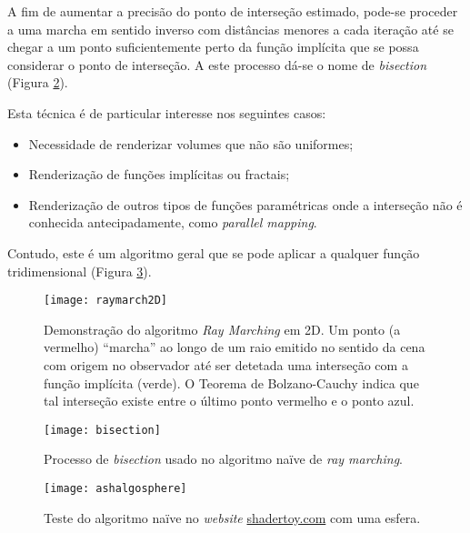 A fim de aumentar a precisão do ponto de interseção estimado, pode-se proceder a uma marcha em sentido inverso com distâncias menores a cada iteração até se chegar a um ponto suficientemente perto da função implícita que se possa considerar o ponto de interseção. A este processo dá-se o nome de \textit{bisection} (Figura \ref{fig::rmarching2DBisection}).

Esta técnica é de particular interesse nos seguintes casos:
\begin{itemize}
    \item Necessidade de renderizar volumes que não são uniformes;
    \item Renderização de funções implícitas ou fractais;
    \item Renderização de outros tipos de funções paramétricas onde a interseção não é conhecida antecipadamente, como \textit{parallel mapping}.
\end{itemize}

Contudo, este é um algoritmo geral que se pode aplicar a qualquer função tridimensional (Figura \ref{fig::ashalgosphere}).

\begin{figure}[!htbp]
    \centering
    \texttt{[image: raymarch2D]}
    \caption[Algoritmo \textit{Ray Marching} em 2D]{Demonstração do algoritmo \textit{Ray Marching} em 2D. Um ponto (a vermelho) ``marcha'' ao longo de um raio emitido no sentido da cena com origem no observador até ser detetada uma interseção com a função implícita (verde). O Teorema de Bolzano-Cauchy indica que tal interseção existe entre o último ponto vermelho e o ponto azul.}
    \label{fig::rmarching2D}
\end{figure}

\begin{figure}[!htbp]
    \centering
    \texttt{[image: bisection]}
    \caption[Processo de \textit{bisection} usado no algoritmo naïve de \textit{ray marching}]{Processo de \textit{bisection} usado no algoritmo naïve de \textit{ray marching}.}
    \label{fig::rmarching2DBisection}
\end{figure}

\begin{figure}[!htbp]
	\centering
	\texttt{[image: ashalgosphere]}
	\caption[Teste do algoritmo naïve numa esfera]{Teste do algoritmo naïve no \textit{website} \url{shadertoy.com} com uma esfera.}
	\label{fig::ashalgosphere}
\end{figure}


